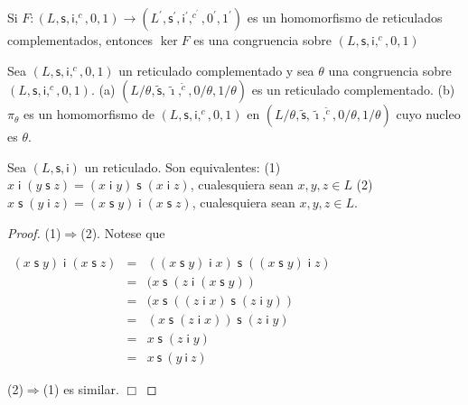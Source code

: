   \begin{lemma}
    Si \(F:(L,\mathsf{s},\mathsf{i},^{c},0,1)\rightarrow (L^{\prime },\mathsf{s} ^{\prime },\mathsf{i}^{\prime },^{c^{\prime }},0^{\prime },1^{\prime })\) es un homomorfismo de reticulados complementados, entonces \(\ker F\) es una congruencia sobre \((L,\mathsf{s},\mathsf{i},^{c},0,1)\)
  \end{lemma}

  \begin{lemma}
    Sea \((L,\mathsf{s},\mathsf{i},^{c},0,1)\) un reticulado complementado y sea \( \theta \) una congruencia sobre \((L,\mathsf{s},\mathsf{i},^{c},0,1)\).
    (a) \((L/\theta ,\mathsf{\tilde{s}},\mathsf{\tilde{\imath}},^{\tilde{c} },0/\theta ,1/\theta )\) es un reticulado complementado.
    (b) \(\pi _{\theta }\) es un homomorfismo de \((L,\mathsf{s},\mathsf{i} ,^{c},0,1)\) en \((L/\theta ,\mathsf{\tilde{s}},\mathsf{\tilde{\imath}},^{ \tilde{c}},0/\theta ,1/\theta )\) cuyo nucleo es \(\theta \).
  \end{lemma}

  \begin{lemma}
    Sea \((L,\mathsf{s},\mathsf{i})\) un reticulado. Son equivalentes:
    (1) \(x\mathsf{\;i\;}(y\;\mathsf{s}\;z)=(x\mathsf{\;i\;}y)\;\mathsf{s} \;(x\mathsf{\;i\;}z)\), cualesquiera sean \(x,y,z\in L\)
    (2) \(x\;\mathsf{s}\;(y\mathsf{\;i\;}z)=(x\mathsf{\;s\;}y)\mathsf{\;i\; }(x\;\mathsf{s}\;z)\), cualesquiera sean \(x,y,z\in L\).
  \end{lemma}
  \begin{proof}
    (1)\(\Rightarrow \)(2). Notese que

    \(\displaystyle \begin{array}{rcl} (x\mathsf{\;s\;}y)\mathsf{\;i\;}(x\;\mathsf{s}\;z) & =& ((x\mathsf{\;s\;}y) \mathsf{\;i\;}x)\;\mathsf{s}\;((x\mathsf{\;s\;}y)\mathsf{\;i\;}z) \\ & =& (x\;\mathsf{s}\;(z\mathsf{\;i\;}(x\mathsf{\;s\;}y)) \\ & =& (x\;\mathsf{s}\;((z\;\mathsf{i\;}x)\mathsf{\;s\;}(z\;\mathsf{i\;}y)) \\ & =& (x\;\mathsf{s}\;(z\;\mathsf{i\;}x))\mathsf{\;s\;}(z\;\mathsf{i\;}y) \\ & =& x\mathsf{\;s\;}(z\;\mathsf{i\;}y) \\ & =& x\mathsf{\ s\ }(y\ \mathsf{i\ }z) \end{array} \)

    (2)\(\Rightarrow \)(1) es similar. \(\Box\)
  \end{proof}


